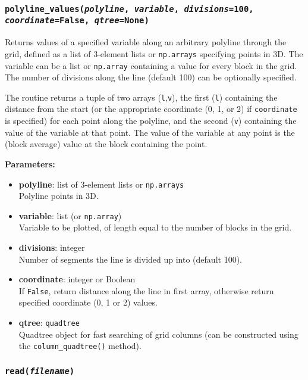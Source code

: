 \subsubsection{\texttt{polyline\_values(\emph{polyline}, \emph{variable}, \emph{divisions}=100, \emph{coordinate}=\texttt{False}, \emph{qtree}=None)}}
\label{sec:polyline_values}

Returns values of a specified variable along an arbitrary polyline through the grid, defined as a list of 3-element lists or \texttt{np.arrays} specifying points in 3D.  The variable can be a list or \texttt{np.array} containing a value for every block in the grid.  The number of divisions along the line (default 100) can be optionally specified.

The routine returns a tuple of two arrays (\texttt{l},\texttt{v}), the first (\texttt{l}) containing the distance from the start (or the appropriate coordinate (0, 1, or 2) if \texttt{coordinate} is specified) for each point along the polyline, and the second (\texttt{v}) containing the value of the variable at that point.  The value of the variable at any point is the (block average) value at the block containing the point.

\textbf{Parameters:}
\begin{itemize}
\item \textbf{polyline}: list of 3-element lists or \texttt{np.arrays}\\
  Polyline points in 3D.
\item \textbf{variable}: list (or \texttt{np.array})\\
  Variable to be plotted, of length equal to the number of blocks in the grid.
\item \textbf{divisions}: integer\\
  Number of segments the line is divided up into (default 100).
\item \textbf{coordinate}: integer or Boolean\\
  If \texttt{False}, return distance along the line in first array, otherwise return specified coordinate (0, 1 or 2) values.
\item \textbf{qtree}: \texttt{quadtree}\\
  Quadtree object for fast searching of grid columns (can be constructed using the \texttt{column\_quadtree()} method).
\end{itemize}

\subsubsection{\texttt{read(\emph{filename})}}
\label{sec:read}

